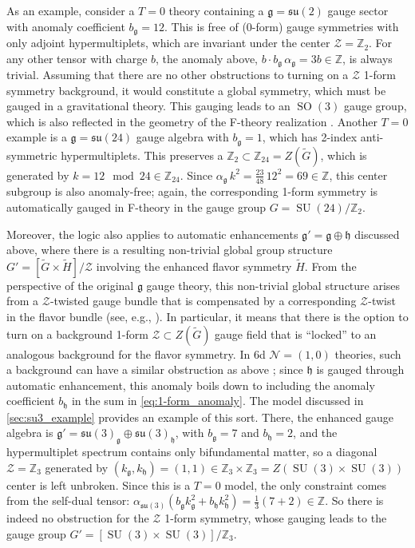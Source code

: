 \documentclass[11pt, a4paper]{article}
\newcommand*{\bbZ}{\ensuremath{\mathbb{Z}}}
\newcommand*{\cN}{\ensuremath{\mathcal{N}}}
\newcommand*{\cZ}{\ensuremath{\mathcal{Z}}}
\newcommand*{\fkg}{\ensuremath{\mathfrak{g}}}
\newcommand*{\fkh}{\ensuremath{\mathfrak{h}}}
\DeclareMathOperator{\SO}{SO}
\DeclareMathOperator{\SU}{SU}
\newcommand*{\fksu}{\ensuremath{\mathfrak{su}}}
\begin{document}
As an example, consider a $T=0$ theory containing a $\fkg = \fksu(2)$ gauge sector with anomaly coefficient $b_\fkg = 12$.
This is free of (0-form) gauge symmetries with only adjoint hypermultiplets, which are invariant under the center $\cZ = \bbZ_2$.
For any other tensor with charge $b$, the anomaly above, $b \cdot b_\fkg \, \alpha_\fkg = 3b \in \bbZ$, is always trivial.
Assuming that there are no other obstructions to turning on a $\cZ$ 1-form symmetry background, it would constitute a global symmetry, which must be gauged in a gravitational theory.
This gauging leads to an $\SO(3)$ gauge group, which is also reflected in the geometry of the F-theory realization \cite{Morrison:2021wuv,Raghuram:2020vxm}.
Another $T=0$ example is a $\fkg = \fksu(24)$ gauge algebra with $b_\fkg = 1$, which has 2-index anti-symmetric hypermultiplets.
This preserves a $\bbZ_2 \subset \bbZ_{24} = Z(\widetilde{G})$, which is generated by $k = 12 \mod 24 \in \bbZ_{24}$.
Since $\alpha_\fkg \, k^2 = \frac{23}{48} \, 12^2 = 69 \in \bbZ$, this center subgroup is also anomaly-free; again, the corresponding 1-form symmetry is automatically gauged in F-theory \cite{Morrison:2011mb} in the gauge group $G = \SU(24) / \bbZ_2$.


Moreover, the logic also applies to automatic enhancements $\fkg' = \fkg \oplus \fkh$ discussed above, where there is a resulting non-trivial global group structure $G' = [\widetilde{G} \times \widetilde{H}] / \cZ$ involving the enhanced flavor symmetry $\widetilde{H}$.
From the perspective of the original $\fkg$ gauge theory, this non-trivial global structure arises from a $\cZ$-twisted gauge bundle that is compensated by a corresponding $\cZ$-twist in the flavor bundle (see, e.g., \cite{Cohen:1983sd,Cherman:2017tey,Shimizu:2017asf,Gaiotto:2017tne}).
In particular, it means that there is the option to turn on a background 1-form $\cZ \subset Z(\widetilde{G})$ gauge field that is ``locked'' to an analogous background for the flavor symmetry.
In 6d $\cN=(1,0)$ theories, such a background can have a similar obstruction as above \cite{Apruzzi:2020zot}; since $\fkh$ is gauged through automatic enhancement, this anomaly boils down to including the anomaly coefficient $b_\fkh$ in the sum in \cref{eq:1-form_anomaly}.
The model discussed in \cref{sec:su3_example} provides an example of this sort.
There, the enhanced gauge algebra is $\fkg' = \fksu(3)_\fkg \oplus \fksu(3)_\fkh$, with $b_\fkg = 7$ and $b_\fkh = 2$, and the hypermultiplet spectrum contains only bifundamental matter, so a diagonal $\cZ = \bbZ_3$ generated by $(k_\fkg, k_\fkh) = (1,1) \in \bbZ_3 \times \bbZ_3 = Z(\SU(3) \times \SU(3))$ center is left unbroken.
Since this is a $T=0$ model, the only constraint comes from the self-dual tensor: $\alpha_{\fksu(3)} (b_\fkg k_\fkg^2 + b_\fkh k_\fkh^2) = \frac13 (7 + 2) \in \bbZ$.
So there is indeed no obstruction for the $\cZ$ 1-form symmetry, whose gauging leads to the gauge group $G' = [\SU(3) \times \SU(3)]/\bbZ_3$.
\end{document}
